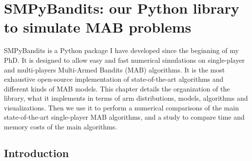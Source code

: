 
\chapter{SMPyBandits: our Python library to simulate MAB problems}
\label{chapter:3}

\graphicspath{{2-Chapters/3-Chapter/Images/}{2-Chapters/3-Chapter/logs/}{2-Chapters/3-Chapter/SMPyBandits_paper.git/plots/}}


\abstractStartChapter{}%
%
SMPyBandits is a Python package I have developed since the beginning of my PhD.
It is designed to allow easy and fast numerical simulations on single-player and multi-players Multi-Armed Bandits (MAB) algorithms.
It is the most exhaustive open-source implementation of state-of-the-art algorithms and different kinds of MAB models.
%
This chapter details the organization of the library, what it implements in terms of arm distributions, models, algorithms and visualizations.
Then we use it to perform a numerical comparisons of the main state-of-the-art single-player MAB algorithms, and a study to compare time and memory costs of the main algorithms.

\minitocStartChapter{}

\section{Introduction}
\label{sec:3:Introduction}



